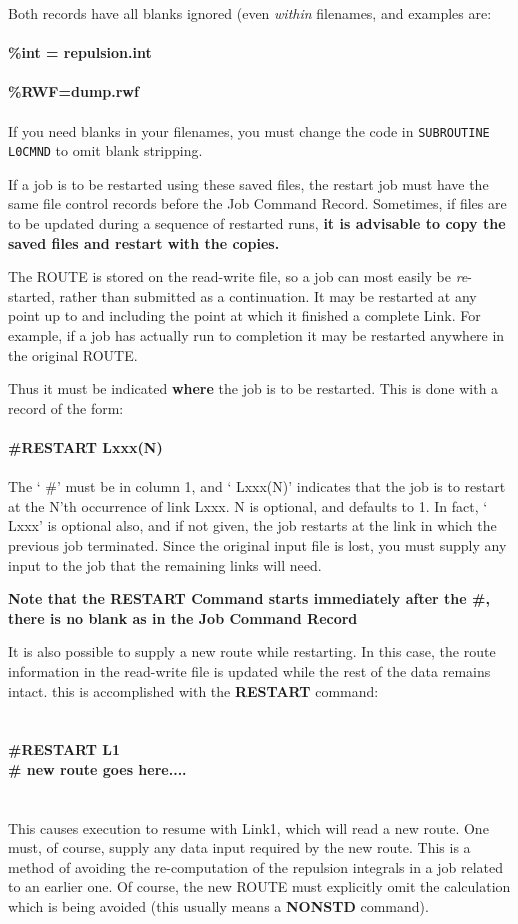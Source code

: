 Both records have all blanks ignored (even {\em within} filenames, 
and examples are: \\
\ \\
{\bf \%int = repulsion.int} \\
\ \\
{\bf \%RWF=dump.rwf}
\ \\
\ \\
If you need blanks in your filenames, you must change the code
in {\tt SUBROUTINE L0CMND} to omit blank stripping.

If a job is to be restarted
using these saved files, the restart job must
have the same file control records
before the Job Command Record.
Sometimes, if files are to be updated during a sequence
of restarted runs, {\bf it is advisable to
copy the saved files and restart with the copies.}

The ROUTE is stored on the read-write file, so a job can most easily be 
{\em re}-started, rather than submitted as a continuation. 
It may be restarted at any point up to and including
the point at which it finished a complete Link. For example,
if a job has actually run to completion it may be restarted anywhere 
in the original ROUTE.

Thus it must be indicated {\bf where} the job  is to be restarted.  
This is done
with a record of the form:  \\
\ \\
{\bf \#RESTART Lxxx(N)}  \\
\ \\
The ` \#' must be in column 1, and ` Lxxx(N)' 
indicates that the job is to
restart at the N'th occurrence of link Lxxx. N is optional, and defaults
to 1. In fact, ` Lxxx' is optional also, and if not given, the job
restarts at the link in which the previous job terminated. Since the
original input  file is lost, you must supply any input to the job that
the remaining links will need. 

{\bf Note that the RESTART Command starts immediately after the \#,
there is no blank as in the Job Command Record}

It is also possible to supply  a new
route while  restarting.  In this case, the route information in the
read-write file is updated while the  rest of the data remains intact.
this is accomplished with the {\bf  RESTART} command:  \\
\ \\
\ \\
{\bf \#RESTART L1  \\
\# new route goes here....}  \\
\ \\
\ \\
This causes execution to resume with Link1, which will read a new
route. One must, of course, supply any data input required by the new
route. This is a method of avoiding the re-computation of the
repulsion integrals in a job related to an earlier one. Of course,
the new ROUTE must explicitly omit the calculation which is being
avoided (this usually means a {\bf NONSTD} command).

